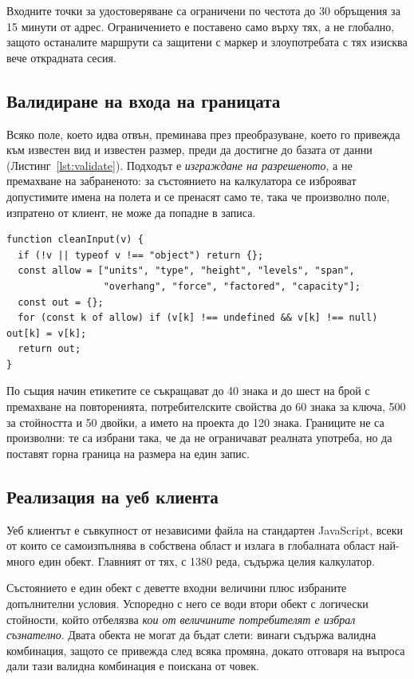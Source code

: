 Входните точки за удостоверяване са ограничени по честота до 30 обръщения за 15
минути от адрес. Ограничението е поставено само върху тях, а не глобално, защото
останалите маршрути са защитени с маркер и злоупотребата с тях изисква вече открадната
сесия.

\subsection{Валидиране на входа на границата}
\label{subsec:validation}

Всяко поле, което идва отвън, преминава през преобразуване, което го привежда към
известен вид и известен размер, преди да достигне до базата от данни
(Листинг~\ref{lst:validate}). Подходът е \emph{изграждане на разрешеното}, а не
премахване на забраненото: за състоянието на калкулатора се изброяват допустимите
имена на полета и се пренасят само те, така че произволно поле, изпратено от клиент,
не може да попадне в записа.

\begin{lstlisting}[caption={Изграждане на разрешеното вместо премахване на забраненото},label={lst:validate}]
function cleanInput(v) {
  if (!v || typeof v !== "object") return {};
  const allow = ["units", "type", "height", "levels", "span",
                 "overhang", "force", "factored", "capacity"];
  const out = {};
  for (const k of allow) if (v[k] !== undefined && v[k] !== null) out[k] = v[k];
  return out;
}
\end{lstlisting}

По същия начин етикетите се съкращават до 40 знака и до шест на брой с премахване на
повторенията, потребителските свойства до 60 знака за ключа, 500 за стойността и 50
двойки, а името на проекта до 120 знака. Границите не са произволни: те са избрани
така, че да не ограничават реалната употреба, но да поставят горна граница на
размера на един запис.

\subsection{Реализация на уеб клиента}
\label{subsec:webimpl}

Уеб клиентът е съвкупност от независими файла на стандартен JavaScript, всеки от
които се самоизпълнява в собствена област и излага в глобалната област най-много един
обект. Главният от тях,  с 1380 реда, съдържа целия калкулатор.

Състоянието е един обект  с деветте входни величини плюс избраните
допълнителни условия. Успоредно с него се води втори обект  с
логически стойности, който отбелязва \emph{кои от величините потребителят е избрал
съзнателно}. Двата обекта не могат да бъдат слети:  винаги съдържа валидна
комбинация, защото се привежда след всяка промяна, докато 
отговаря на въпроса дали тази валидна комбинация е поискана от човек.

